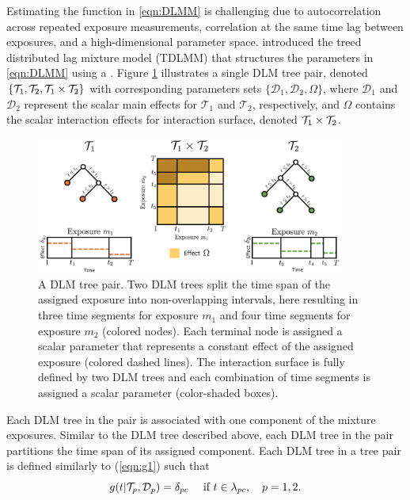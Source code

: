 Estimating the function in \eqref{eqn:DLMM} is challenging due to autocorrelation across repeated exposure measurements, correlation at the same time lag between exposures, and a high-dimensional parameter space. \cite{mork_estimating_2023} introduced the treed distributed lag mixture model (TDLMM) that structures the parameters in \eqref{eqn:DLMM} using a . Figure \ref{fig:dlmtreepair} illustrates a single DLM tree pair, denoted $\{\mathcal{T}_1, \mathcal{T}_2, \mathcal{T}_1 \times \mathcal{T}_2\}$ with corresponding parameters sets $\{\mathcal{D}_1, \mathcal{D}_2, \Omega\}$, where $\mathcal{D}_1$ and $\mathcal{D}_2$ represent the scalar main effects for $\mathcal{T}_1$ and $\mathcal{T}_2$, respectively, and $\Omega$ contains the scalar interaction effects for interaction surface, denoted $\mathcal{T}_1 \times \mathcal{T}_2$.
\begin{figure}[ht]
    \centering
    \includegraphics[width = 0.9\textwidth]{images/dlmtreepair.png}
        \caption{A DLM tree pair. Two DLM trees split the time span of the assigned exposure into non-overlapping intervals, here resulting in three time segments for exposure $m_1$ and four time segments for exposure $m_2$ (colored nodes). Each terminal node is assigned a scalar parameter that represents a constant effect of the assigned exposure (colored dashed lines). The interaction surface is fully defined by two DLM trees and each combination of time segments is assigned a scalar parameter (color-shaded boxes).}
    \label{fig:dlmtreepair}
\end{figure}
Each DLM tree in the pair is associated with one component of the mixture exposures. Similar to the DLM tree described above, each DLM tree in the pair partitions the time span of its assigned component. Each DLM tree in a tree pair is defined similarly to (\ref{eqn:g1}) such that
\begin{equation}
    \label{eqn:g2}
    g(t|\mathcal{T}_{p}, \mathcal{D}_{p}) = \delta_{pc} \quad \text{ if } t \in \lambda_{pc}, \quad p = 1, 2.
\end{equation}

